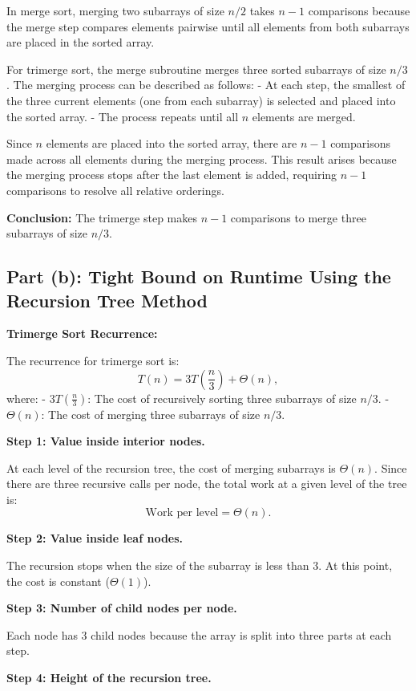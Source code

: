 \documentclass{article}
\begin{document}
In merge sort, merging two subarrays of size \( n/2 \) takes \( n - 1 \) comparisons because the merge step compares elements pairwise until all elements from both subarrays are placed in the sorted array.

For trimerge sort, the merge subroutine merges three sorted subarrays of size \( n/3 \). The merging process can be described as follows:
- At each step, the smallest of the three current elements (one from each subarray) is selected and placed into the sorted array.
- The process repeats until all \( n \) elements are merged.

Since \( n \) elements are placed into the sorted array, there are \( n - 1 \) comparisons made across all elements during the merging process. This result arises because the merging process stops after the last element is added, requiring \( n - 1 \) comparisons to resolve all relative orderings.

\textbf{Conclusion:} The trimerge step makes \( n - 1 \) comparisons to merge three subarrays of size \( n/3 \).

\subsection*{Part (b): Tight Bound on Runtime Using the Recursion Tree Method}

\textbf{Trimerge Sort Recurrence:}

The recurrence for trimerge sort is:
\[
T(n) = 3T\left(\frac{n}{3}\right) + \Theta(n),
\]
where:
- \( 3T\left(\frac{n}{3}\right) \): The cost of recursively sorting three subarrays of size \( n/3 \).
- \( \Theta(n) \): The cost of merging three subarrays of size \( n/3 \).

\textbf{Step 1: Value inside interior nodes.}

At each level of the recursion tree, the cost of merging subarrays is \( \Theta(n) \). Since there are three recursive calls per node, the total work at a given level of the tree is:
\[
\text{Work per level} = \Theta(n).
\]

\textbf{Step 2: Value inside leaf nodes.}

The recursion stops when the size of the subarray is less than 3. At this point, the cost is constant (\( \Theta(1) \)).

\textbf{Step 3: Number of child nodes per node.}

Each node has 3 child nodes because the array is split into three parts at each step.

\textbf{Step 4: Height of the recursion tree.}
\end{document}
